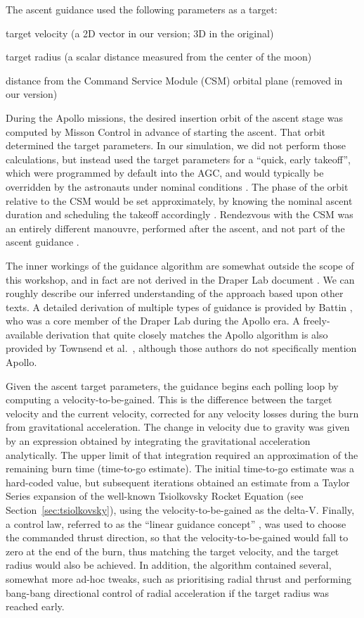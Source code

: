 \documentclass[12pt,openany]{book}
\begin{document}
The ascent guidance used the following parameters as a target:
\begin{paritemize}
\item target velocity (a 2D vector in our version; 3D in the original)
\item target radius (a scalar distance measured from the center of the moon)
\item distance from the Command Service Module (CSM) orbital plane (removed in our version)
\end{paritemize}
During the Apollo missions, the desired insertion orbit of the ascent stage was computed by Misson Control in advance of starting the ascent. That orbit determined the target parameters. In our simulation, we did not perform those calculations, but instead used the target parameters for a ``quick, early takeoff'', which were programmed by default into the AGC, and would typically be overridden by the astronauts under nominal conditions \cite{levine1971}. The phase of the orbit relative to the CSM would be set approximately, by knowing the nominal ascent duration and scheduling the takeoff accordingly \cite{levine1971}. Rendezvous with the CSM was an entirely different manouvre, performed after the ascent, and not part of the ascent guidance \cite{levine1971}.

The inner workings of the guidance algorithm are somewhat outside the scope of this workshop, and in fact are not derived in the Draper Lab document \cite{levine1971}. We can roughly describe our inferred understanding of the approach based upon other texts. A detailed derivation of multiple types of guidance is provided by Battin \cite{battin1999}, who was a core member of the Draper Lab during the Apollo era. A freely-available derivation that quite closely matches the Apollo algorithm is also provided by Townsend et al.~\cite{townsend1968}, although those authors do not specifically mention Apollo.

Given the ascent target parameters, the guidance begins each polling loop by computing a velocity-to-be-gained. This is the difference between the target velocity and the current velocity, corrected for any velocity losses during the burn from gravitational acceleration. The change in velocity due to gravity was given by an expression obtained by integrating the gravitational acceleration analytically. The upper limit of that integration required an approximation of the remaining burn time (time-to-go estimate). The initial time-to-go estimate was a hard-coded value, but subsequent iterations obtained an estimate from a Taylor Series expansion of the well-known Tsiolkovsky Rocket Equation (see Section~\ref{sec:tsiolkovsky}), using the velocity-to-be-gained as the delta-V. Finally, a control law, referred to as the ``linear guidance concept'' \cite{levine1971}, was used to choose the commanded thrust direction, so that the velocity-to-be-gained would fall to zero at the end of the burn, thus matching the target velocity, and the target radius would also be achieved. In addition, the algorithm contained several, somewhat more ad-hoc tweaks, such as prioritising radial thrust and performing bang-bang directional control of radial acceleration if the target radius was reached early.
\end{document}
